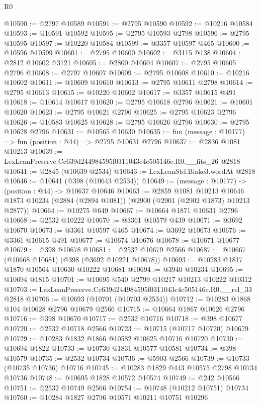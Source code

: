\begin{lexlean}{R0}
\begin{coremodule}
@10590 := @2797 @10589
@10591 := @2795 @10590
@10592 := @10216 @10584
@10593 := @10591 @10592
@10595 := @2795 @10593 @2798
@10596 := @2795 @10595
@10597 := @10220 @10584
@10599 := @3357 @10597 @465
@10600 := @10596 @10599
@10601 := @2795 @10600
@10602 := @3115 @138
@10604 := @2812 @10602 @3121
@10605 := @2800 @10604
@10607 := @2795 @10605 @2796
@10608 := @2797 @10607
@10609 := @2795 @10608
@10610 := @10216 @10602
@10611 := @10609 @10610
@10613 := @2795 @10611 @2798
@10614 := @2795 @10613
@10615 := @10220 @10602
@10617 := @3357 @10615 @491
@10618 := @10614 @10617
@10620 := @2795 @10618 @2796
@10621 := @10601 @10620
@10623 := @2795 @10621 @2796
@10625 := @2795 @10623 @2796
@10626 := @10583 @10625
@10628 := @2795 @10626 @2796
@10630 := @2795 @10628 @2796
@10631 := @10565 @10630
@10635 := fun (message : @10177) => fun (position : @44) => @2795 @10631 @2796
@10637 := @2836 @1081 @10213
@10639 := LexLeanPreserve.Cc639d244984595f0311043c4c505146e.R0.__fits_26 @2818
@10641 := @2845 (@10639 @2534)
@10643 := LexLeanStd.Blake3.wordAt @2818
@10646 := @10641 (@398 (@10643 @2534))
@10649 := (message : @10177) -> (position : @44) -> @10637 @10646
@10663 := @2859
    @1081
    @10213
    @10646
    @1873
    @10234
    (@2884 (@2894 @1081))
    (@2900 (@2901 (@2902 @1873) @10213 @2877))
@10664 := @10275 @649
@10667 := @10664 @1871 @10631 @2796
@10668 := @2532 @10222
@10670 := @3361 @10579 @439
@10671 := @3692 @10670
@10673 := @3361 @10597 @465
@10674 := @3692 @10673
@10676 := @3361 @10615 @491
@10677 := @10674 @10676
@10678 := @10671 @10677
@10679 := @398 @10678
@10681 := @2532 @10679 @2566
@10687 := @10667 (@10668 @10681) (@398 (@3692 @10221 @10678))
@10693 := @10283 @1817 @1870 @10564 @10630 @10222 @10681
@10694 := @3940 @10234
@10695 := @10694 @1815
@10701 := @10695 @540 @2799 @10217 @10213 @10222 @10312
@10703 := LexLeanPreserve.Cc639d244984595f0311043c4c505146e.R0.__rel_33 @2818
@10706 := @10693 (@10701 (@10703 @2534))
@10712 := @10283 @1868 @104 @10628 @2796 @10679 @2566
@10715 := @10664 @1867 @10626 @2796
@10716 := @398 @10670
@10717 := @2532 @10716
@10718 := @398 @10677
@10720 := @2532 @10718 @2566
@10723 := @10715 (@10717 @10720) @10679
@10729 := @10283 @1832 @1866 @10582 @10625 @10716 @10720
@10730 := @10694 @1822
@10733 := @10730 @1831 @10577 @10581
@10734 := @398 @10579
@10735 := @2532 @10734
@10736 := @5903 @2566
@10739 := @10733 (@10735 @10736) @10716
@10745 := @10283 @1829 @443 @10575 @2798 @10734 @10736
@10748 := @10695 @1828 @10572 @10574
@10749 := @242 @10566
@10751 := @2532 @10749 @2566
@10754 := @10748 (@10212 @10751) @10734
@10760 := @10284 @1827 @2796 @10571 @10211 @10751 @10296

\end{coremodule}
\end{lexlean}
